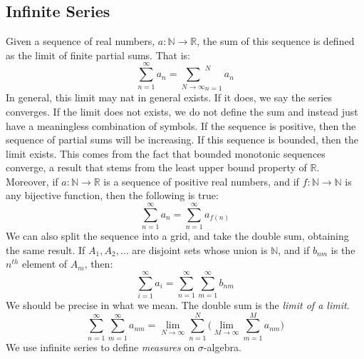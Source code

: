\documentclass[crop=false,class=book,oneside]{standalone}
\begin{document}
        \subsection{Infinite Series}
            Given a sequence of real numbers,
            $a:\mathbb{N}\rightarrow\mathbb{R}$, the sum of this
            sequence is defined as the limit of
            finite partial sums. That is:
            \begin{equation}
                \sum_{n=1}^{\infty}a_{n}=
                \underset{N\rightarrow\infty}\sum_{n=1}^{N}a_{n}
            \end{equation}
            In general, this limit may nat in general exists. If it
            does, we say the series converges. If the limit does
            not exists, we do not define the sum and instead just
            have a meaningless combination of symbols. If the
            sequence is positive, then the sequence of partial sums
            will be increasing. If this sequence is bounded, then
            the limit exists. This comes from the fact that bounded
            monotonic sequences converge, a result that stems from
            the least upper bound property of $\mathbb{R}$.
            Moreover, if $a:\mathbb{N}\rightarrow\mathbb{R}$ is a
            sequence of positive real numbers, and if
            $f:\mathbb{N}\rightarrow\mathbb{N}$ is any bijective
            function, then the following is true:
            \begin{equation}
                \sum_{n=1}^{\infty}a_{n}
                =\sum_{n=1}^{\infty}a_{f(n)}
            \end{equation}
            We can also split the sequence into a grid,
            and take the
            double sum, obtaining the same result. If
            $A_{1},A_{2},\hdots$ are disjoint sets whose union is
            $\mathbb{N}$, and if $b_{nm}$ is the $n^{th}$ element
            of $A_{m}$, then:
            \begin{equation}
                \sum_{i=1}^{\infty}a_{i}=
                \sum_{n=1}^{\infty}\sum_{m=1}^{\infty}b_{nm}
            \end{equation}
            We should be precise in what we mean. The double
            sum is the \textit{limit of a limit}.
            \begin{equation}
                \sum_{n=1}^{\infty}\sum_{m=1}^{\infty}a_{nm}
                =\underset{N\rightarrow\infty}{\lim}\sum_{n=1}^{N}
                \Big(\underset{M\rightarrow\infty}{\lim}
                \sum_{m=1}^{M}a_{nm}\Big)
            \end{equation}
            We use infinite series to define \textit{measures} on
            $\sigma$-algebra.
\end{document}
